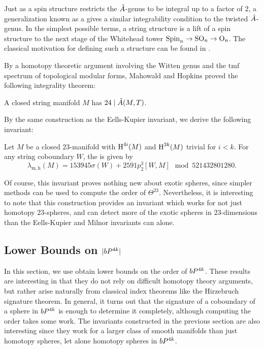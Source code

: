 Just as a spin structure restricts the ${\hat{A}}$-genus to be integral up to a factor of $2$, a generalization known as a  gives a similar integrability condition to the twisted ${\hat{A}}$-genus. In the simplest possible terms, a string structure is a lift of a spin structure to the next stage of the Whitehead tower $\mathrm{Spin}_n \to \mathrm{SO}_n \to \mathrm{O}_n$. The classical motivation for defining such a structure can be found in \cite{witten1988string}.

By a homotopy theoretic argument involving the Witten genus and the $\mathrm{tmf}$ spectrum of topological modular forms, Mahowald and Hopkins proved the following integrality theorem:
\begin{theorem}
	A closed string manifold $M$ has $24\mid {\hat{A}}(M,T)$.
\end{theorem}

By the same construction as the Eells-Kupier invariant, we derive the following invariant:

\begin{corollary}
	Let $M$ be a closed $23$-manifold with $\operatorname{H}^{4i}(M)$ and $\operatorname{H}^{2k}(M)$ trivial for $i<k$. For any string coboundary $W$, the  is given by
	\[
		\lambda_{\mathrm{m,h}}(M) = 153945\sigma(W) + 2591p_2^3[W,M]\mod 521432801280.
	\]
\end{corollary}

Of course, this invariant proves nothing new about exotic spheres, since simpler methods can be used to compute the order of $\Theta^{23}$. Nevertheless, it is interesting to note that this construction provides an invariant which works for not just homotopy $23$-spheres, and can detect more of the exotic spheres in $23$-dimensions than the Eells-Kupier and Milnor invariants can alone.

\subsection{Lower Bounds on \texorpdfstring{$|bP^{4k}|$}{|bP^4k|}}\label{sec:lower-bounds}

In this section, we use obtain lower bounds on the order of $bP^{4k}$. These results are interesting in that they do not rely on difficult homotopy theory arguments, but rather arise naturally from classical index theorems like the Hirzebruch signature theorem. In general, it turns out that the signature of a coboundary of a sphere in $bP^{4k}$ is enough to determine it completely, although computing the order takes some work. The invariants constructed in the previous section are also interesting since they work for a larger class of smooth manifolds than just homotopy spheres, let alone homotopy spheres in $bP^{4k}$. 

